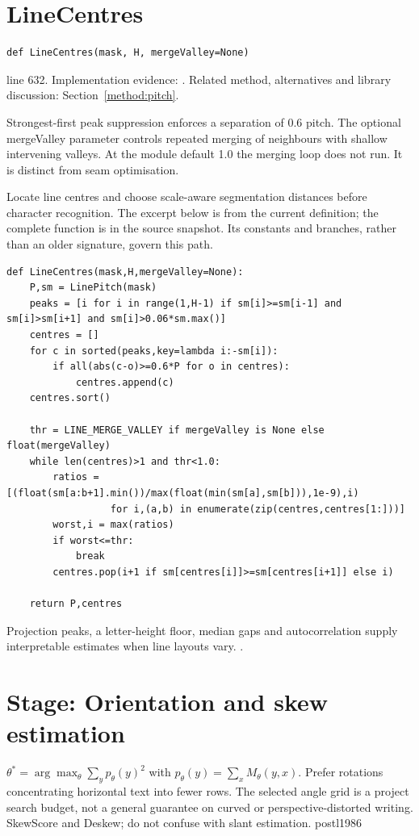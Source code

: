 \section{LineCentres}\label{fn:segment:LineCentres}
\begin{lstlisting}[style=sig]
def LineCentres(mask, H, mergeValley=None)
\end{lstlisting}
 line 632. Implementation evidence: \cite{code2026}. Related method, alternatives and library discussion: Section~\ref{method:pitch}.


Strongest-first peak suppression enforces a separation of 0.6 pitch. The optional mergeValley parameter controls repeated merging of neighbours with shallow intervening valleys. At the module default 1.0 the merging loop does not run. It is distinct from seam optimisation.


Locate line centres and choose scale-aware segmentation distances before character recognition. The excerpt below is from the current definition; the complete function is in the source snapshot. Its constants and branches, rather than an older signature, govern this path.


\begin{lstlisting}[style=plain]
def LineCentres(mask,H,mergeValley=None):
    P,sm = LinePitch(mask)
    peaks = [i for i in range(1,H-1) if sm[i]>=sm[i-1] and sm[i]>sm[i+1] and sm[i]>0.06*sm.max()]
    centres = []
    for c in sorted(peaks,key=lambda i:-sm[i]):
        if all(abs(c-o)>=0.6*P for o in centres):
            centres.append(c)
    centres.sort()

    thr = LINE_MERGE_VALLEY if mergeValley is None else float(mergeValley)
    while len(centres)>1 and thr<1.0:
        ratios = [(float(sm[a:b+1].min())/max(float(min(sm[a],sm[b])),1e-9),i)
                  for i,(a,b) in enumerate(zip(centres,centres[1:]))]
        worst,i = max(ratios)
        if worst<=thr:
            break
        centres.pop(i+1 if sm[centres[i]]>=sm[centres[i+1]] else i)

    return P,centres
\end{lstlisting}
Projection peaks, a letter-height floor, median gaps and autocorrelation supply interpretable estimates when line layouts vary. \cite{postl1986,scipypeaks}.


\section*{Stage: Orientation and skew estimation}
{$\theta^*=\arg\max_\theta\sum_y p_\theta(y)^2$ with
$p_\theta(y)=\sum_x M_\theta(y,x)$.}
{Prefer rotations concentrating horizontal text into fewer rows. The selected
angle grid is a project search budget, not a general guarantee on curved or
perspective-distorted writing.}
{SkewScore and Deskew; do not confuse with slant estimation.}
{postl1986}


